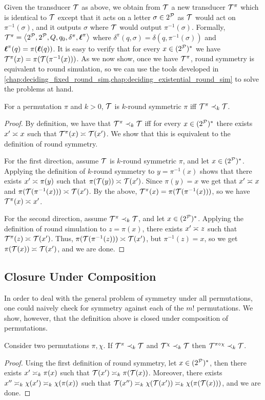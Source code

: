 Given the transducer $\cT$ as above, we obtain from $\cT$ a new transducer $\cT^\pi$ which is identical to $\cT$ except that it acts on a letter $\sigma\in 2^\cP$ as $\cT$ would act on $\pi^{-1}(\sigma)$, and it outputs $\sigma$ where $\cT$ would output $\pi^{-1}(\sigma)$. Formally, $\cT^{\pi}=\tup{2^\cP,2^\cP,Q,q_0,\delta^{\pi},\lab^{\pi}}$ where $\delta^{\pi}(q,\sigma)=\delta(q,\pi^{-1}(\sigma))$ and $\lab^{\pi}(q)=\pi(\lab(q))$. It is easy to verify that for every $x\in (2^{\cP})^*$ we have $\cT^\pi(x) = \pi(\cT(\pi^{-1}(x)))$.
As we now show, once we have $\cT^\pi$, round symmetry is equivalent to round simulation, so we can use the tools developed in~ \cref{chap:deciding_fixed_round_sim,chap:deciding_existential_round_sim} to solve the problems at hand.
\begin{lemma}
    \label{lem:symmetry_to_simulation}
    For a permutation $\pi$ and $k>0$, $\cT$ is $k$-round symmetric \WRT $\pi$ iff $\cT^{\pi}\prec_k \cT$.
\end{lemma}
\begin{proof}
    By definition, we have that $\cT^{\pi}\prec_{k} \cT$ iff for every $x\in (2^{\cP})^*$ there exists $x'\req x$ such that $\cT^{\pi}(x)\req \cT(x')$. We show that this is equivalent to the definition of round symmetry.
    
    For the first direction, assume $\cT$ is $k$-round symmetric \WRT $\pi$, and let $x\in (2^{\cP})^*$. Applying the definition of $k$-round symmetry to $y=\pi^{-1}(x)$ shows that there exists $x'\req \pi(y)$ such that $\pi(\cT(y))\req \cT(x')$. Since $\pi(y)=x$ we get that $x'\req x$ and $\pi(\cT(\pi^{-1}(x)))\req \cT(x')$. By the above, $\cT^\pi(x) = \pi(\cT(\pi^{-1}(x)))$, so we have $\cT^{\pi}(x)\req x'$.
    
    For the second direction, assume $\cT^\pi \prec_k \cT$, and let $x\in (2^{\cP})^*$. Applying the definition of round simulation to $z=\pi(x)$, there exists $x'\req z$ such that $\cT^{\pi}(z)\req \cT(x')$. Thus, $\pi(\cT(\pi^{-1}(z)))\req \cT(x')$, but $\pi^{-1}(z)=x$, so we get $\pi(\cT(x))\req \cT(x')$, and we are done.
\end{proof}

\subsection*{Closure Under Composition}
In order to deal with the general problem of symmetry under all permutations, one could naively check for symmetry against each of the $m!$ permutations. We show, however, that the definition above is closed under composition of permutations. 
\begin{lemma}
    \label{lem:closure_composition}
    Consider two permutations $\pi,\chi$. If $\cT^\pi\prec_k \cT$ and $\cT^\chi \prec_k \cT$ then $\cT^{\pi\circ \chi} \prec_k \cT$.
\end{lemma}
\begin{proof}
    Using the first definition of round symmetry, let $x\in (2^{\cP})^*$, then there exists $x'\req[k] \pi(x)$ such that $\cT(x')\req[k] \pi(\cT(x))$. Moreover, there exists $x''\req[k] \chi(x') \req[k] \chi(\pi(x))$ such that $\cT(x'')\req[k] \chi(\cT(x'))\req[k] \chi(\pi(\cT(x)))$, and we are done.
\end{proof}

